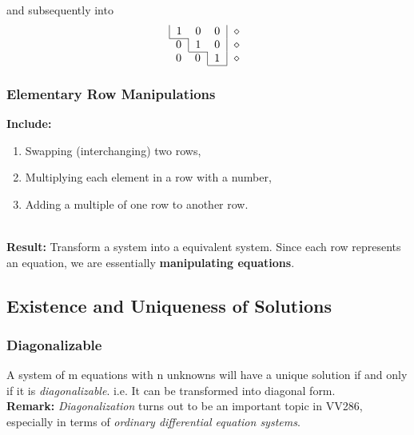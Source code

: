 \documentclass{beamer}
\renewcommand{\emph}[1]{{\color{Turquoise3}\textsl{#1}}}
\begin{document}
\begin{frame}
    and subsequently into \\
    \begin{equation}
        \begin{array}{c}
            \begin{tabular}{|ccc|c}
                1 & $0$ & $0$ & $\diamond$ \\ \cline{1-1}
            \end{tabular} \\
            \begin{tabular}{c|cc|c}
                0 & $1$ & $0$ & $\diamond$ \\ \cline{2-2}
            \end{tabular} \\
            \begin{tabular}{cc|c|c}
                0 & $0$ & $1$ & $\diamond$ \\
                \cline{3-3}
            \end{tabular}
        \end{array}
    \end{equation}
\end{frame}

\begin{frame}
    \frametitle{Elementary Row Manipulations}
    \textbf{Include:}
    \begin{enumerate}
        \item Swapping (interchanging) two rows,
        \item Multiplying each element in a row with a number,
        \item Adding a multiple of one row to another row.
    \end{enumerate}
    ~\\[15pt]

    \textbf{Result:} Transform a system into a equivalent system.
    Since each row represents an equation, we are essentially \textbf{manipulating equations}.
\end{frame}

\subsection{Existence and Uniqueness of Solutions}
\begin{frame}
    \frametitle{Diagonalizable}
    A system of m equations with n unknowns will have a unique solution if and only if it is \emph{diagonalizable}. i.e. It can be transformed into diagonal form.\\[15pt]
    \textbf{Remark:} \emph{Diagonalization} turns out to be an important topic in VV286, especially in terms of \emph{ordinary differential equation systems}.
\end{frame}
\end{document}

